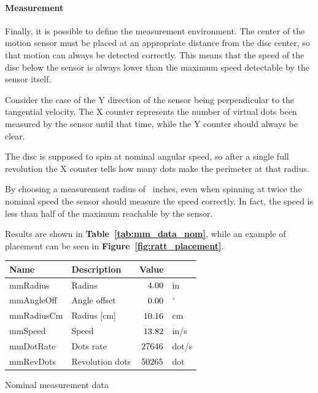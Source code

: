 \documentclass[a4paper,10pt]{article}
\makeatletter
\newenvironment{tablehere}{\def\@captype{table}\vspace{2ex}}{\vspace{2ex}}
\newcommand{\citef}[1]{\textbf{Figure~\ref{#1}}}
\newcommand{\citet}[1]{\textbf{Table~\ref{#1}}}
\makeatother
\begin{document}
\begin{multicols}{2}
\paragraph{Measurement}
Finally, it is possible to define the measurement environment. The center of
the motion sensor must be placed at an appropriate distance from the disc
center, so that motion can always be detected correctly. This means that the
speed of the disc below the sensor is always lower than the maximum speed
detectable by the sensor itself.

Consider the case of the Y direction of the sensor being perpendicular to the
tangential velocity. The X counter represents the number of virtual dots been
measured by the sensor until that time, while the Y counter should always be
clear.

The disc is supposed to spin at nominal angular speed, so after a single full
revolution the X counter tells how many dots make the perimeter at that
radius.

By choosing a measurement radius of \mmRadius\  inches, even when spinning at
twice the nominal speed the sensor should measure the speed correctly. In
fact, the speed is less than half of the maximum reachable by the sensor.

Results are shown in \citet{tab:mm_data_nom}, while an example of placement
can be seen in \citef{fig:ratt_placement}.

\begin{tablehere}
\centering \footnotesize
\begin{tabular}{|l|l|rl|}
\hline
\textbf{Name} & \textbf{Description} & \textbf{Value} &	\\
\hline
mmRadius		& Radius				& $4.00$		& in			\\
mmAngleOff		& Angle offset			& $0.00$		& $^{\circ}$	\\
\hline
mmRadiusCm		& Radius [cm]			& $10.16$		& cm			\\
mmSpeed			& Speed					& $13.82$		& in/s			\\
mmDotRate		& Dots rate				& $27646$		& dot/s			\\
mmRevDots		& Revolution dots		& $50265$		& dot			\\
\hline
\end{tabular}
\caption{Nominal measurement data}
\label{tab:mm_data_nom}
\end{tablehere}


\end{multicols}
\end{document}
